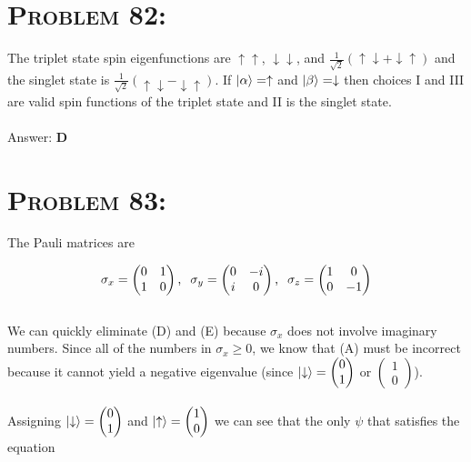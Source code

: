 \documentclass{article}
\begin{document}

\section{\textsc{Problem 82:}} The triplet state spin eigenfunctions are $\uparrow \uparrow$, $\downarrow \downarrow$, and $\frac{1}{\sqrt{2}}\left(  \uparrow \downarrow + \downarrow  \uparrow \right)$ and the singlet state is $\frac{1}{\sqrt{2}}\left(  \uparrow \downarrow - \downarrow  \uparrow \right)$. If $\ket{\alpha} = \uparrow$ and $\ket{\beta} = \downarrow$ then choices I and III are valid spin functions of the triplet state and II is the singlet state.
\\\\
Answer: \textbf{\textcolor{ProcessBlue}D}\\


\section{\textsc{Problem 83:}} The Pauli matrices are

\begin{gather}
\sigma_{x} = \begin{pmatrix} 0&1\\ 1&0 \end{pmatrix} \text{,} \hspace{.1in}
\sigma_{y} = \begin{pmatrix} 0&-i\\ i&0 \end{pmatrix} \text{,} \hspace{.1in}
\sigma_{z} = \begin{pmatrix} 1&0\\ 0&-1 \end{pmatrix}
\end{gather}
\\
We can quickly eliminate (D) and (E) because $\sigma_{x}$ does not involve imaginary numbers. Since all of the numbers in $\sigma_{x} \geq 0$, we know that (A) must be incorrect because it cannot yield a negative eigenvalue (since $\ket{\downarrow} = \begin{pmatrix} 0\\1\end{pmatrix}$ or $\begin{pmatrix} 1\\0\end{pmatrix}$). \\
\\
Assigning $\ket{\downarrow} = \begin{pmatrix} 0\\1\end{pmatrix}$ and $\ket{\uparrow} = \begin{pmatrix} 1\\0\end{pmatrix}$ we can see that the only $\psi$ that satisfies the equation
\end{document}
